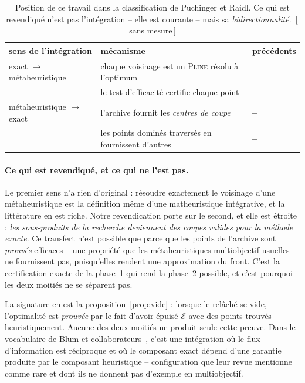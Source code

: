 \documentclass[11pt,a4paper]{article}
\theoremstyle{plain}
\theoremstyle{remark}
\newcommand{\Ecal}{\mathcal{E}}
\newcommand{\ILP}{\textsc{Pline}}
\newcommand{\confna}{\textsf{\footnotesize[\,sans mesure\,]}}
\begin{document}
\begin{table}[H]
\centering
\caption{Position de ce travail dans la classification de Puchinger et
Raidl. Ce qui est revendiqué n'est pas l'intégration -- elle est courante --
mais sa \emph{bidirectionnalité}.\ \confna}
\label{tab:taxo}
\begin{tabular}{lll}
\toprule
sens de l'intégration & mécanisme & précédents\\
\midrule
exact $\to$ métaheuristique
 & chaque voisinage est un \ILP{} résolu à l'optimum
 & \cite{fischetti2003,danna2005}\\
 & le test d'efficacité certifie chaque point & \cite{chergui2008}\\
\midrule
métaheuristique $\to$ exact
 & l'archive fournit les \emph{centres de coupe} & \textbf{--}\\
 & les points dominés traversés en fournissent d'autres & \textbf{--}\\
\bottomrule
\end{tabular}
\end{table}

\paragraph{Ce qui est revendiqué, et ce qui ne l'est pas.} Le premier sens
n'a rien d'original : résoudre exactement le voisinage d'une
métaheuristique est la définition même d'une matheuristique intégrative, et
la littérature en est riche. Notre revendication porte sur le second, et
elle est étroite : \emph{les sous-produits de la recherche deviennent des
coupes valides pour la méthode exacte}. Ce transfert n'est possible que
parce que les points de l'archive sont \emph{prouvés} efficaces -- une
propriété que les métaheuristiques multiobjectif usuelles ne fournissent
pas, puisqu'elles rendent une approximation du front. C'est la certification
exacte de la phase~1 qui rend la phase~2 possible, et c'est pourquoi les
deux moitiés ne se séparent pas.

La signature en est la proposition~\ref{prop:vide} : lorsque le relâché se
vide, l'optimalité est \emph{prouvée} par le fait d'avoir épuisé $\Ecal$
avec des points trouvés heuristiquement. Aucune des deux moitiés ne produit
seule cette preuve. Dans le vocabulaire de Blum et
collaborateurs~\cite{blum2011}, c'est une intégration où le flux
d'information est réciproque et où le composant exact dépend d'une garantie
produite par le composant heuristique -- configuration que leur revue
mentionne comme rare et dont ils ne donnent pas d'exemple en multiobjectif.
\end{document}
